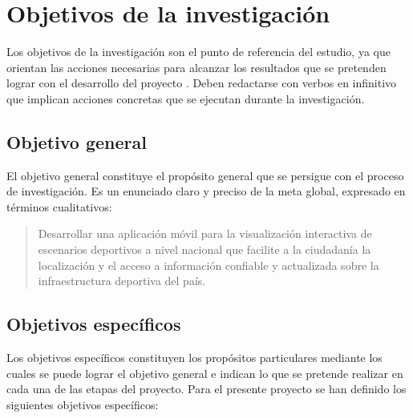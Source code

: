 
\section{Objetivos de la investigaci\'on}

Los objetivos de la investigaci\'on son el punto de referencia del estudio, ya
que orientan las acciones necesarias para alcanzar los resultados que se
pretenden lograr con el desarrollo del proyecto \citep{arias2012}. Deben
redactarse con verbos en infinitivo que implican acciones concretas que se
ejecutan durante la investigaci\'on.

\subsection{Objetivo general}

El objetivo general constituye el prop\'osito general que se persigue con el
proceso de investigaci\'on. Es un enunciado claro y preciso de la meta global,
expresado en t\'erminos cualitativos:

\begin{quote}
Desarrollar una aplicaci\'on m\'ovil para la visualizaci\'on interactiva
de escenarios deportivos a nivel nacional que facilite a la ciudadan\'ia la
localizaci\'on y el acceso a informaci\'on confiable y actualizada sobre la
infraestructura deportiva del pa\'is.
\end{quote}

\subsection{Objetivos espec\'ificos}

Los objetivos espec\'ificos constituyen los prop\'ositos particulares mediante los
cuales se puede lograr el objetivo general e indican lo que se pretende
realizar en cada una de las etapas del proyecto. Para el presente proyecto se
han definido los siguientes objetivos espec\'ificos:


